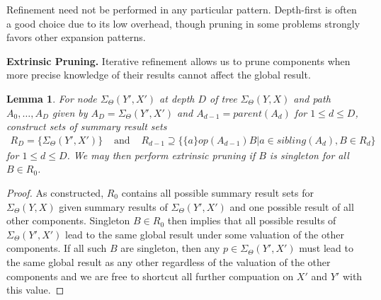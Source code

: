 \documentclass{article}
\newtheorem{lemma}{Lemma}
\newcommand{\GNP}[1][\psi]{{#1}_{\Theta}}
\begin{document}
Refinement need not be performed in any particular pattern.
Depth-first is often a good choice due to its low overhead, though
pruning in some problems strongly favors other expansion patterns.


{\bf Extrinsic Pruning.}  Iterative refinement allows us to prune
components when more precise knowledge of their results cannot affect
the global result.
\begin{lemma}
  For node $\GNP[\Sigma](Y',X')$ at depth $D$ of tree
  $\GNP[\Sigma](Y,X)$ and path $A_0,\ldots,A_D$ given by $A_D =
  \GNP[\Sigma](Y',X')$ and $A_{d-1} = parent(A_{d})$ for $1 \leq d
  \leq D$, construct sets of summary result sets
  \[ \begin{array}{rcl}
    R_D = \{\GNP[\Sigma](Y',X')\} & \mbox{ and } & R_{d-1} \supseteq \{\{a\} \mathbin{op(A_{d-1})} B | a \in sibling(A_d), B \in R_d\}
  \end{array} \]
  for $1 \leq d \leq D$.  We may then perform {\em extrinsic pruning}
  if $B$ is singleton for all $B \in R_0$.
\end{lemma}
\begin{proof}
  As constructed, $R_0$ contains all possible summary result sets for
  $\GNP[\Sigma](Y,X)$ given summary results of $\GNP[\Sigma](Y',X')$
  and one possible result of all other components.  Singleton $B \in
  R_0$ then implies that all possible results of $\GNP[\Sigma](Y',X')$
  lead to the same global result under some valuation of the other
  components.  If all such $B$ are singleton, then any $p \in
  \GNP[\Sigma](Y',X')$ must lead to the same global result as any
  other regardless of the valuation of the other components and we are
  free to shortcut all further compuation on $X'$ and $Y'$ with this
  value.
\end{proof}
\end{document}
